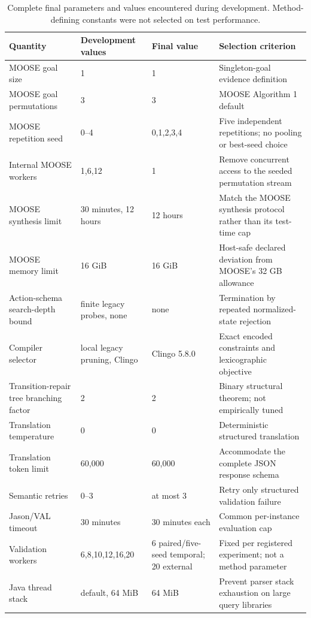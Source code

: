 \begin{table}[htbp]
\centering
\small
\setlength{\tabcolsep}{3pt}
\begin{tabular}{p{}p{}p{}p{}}
\toprule
Quantity & Development values & Final value & Selection criterion \\
\midrule
MOOSE goal size & 1 & 1 & Singleton-goal evidence definition \\
MOOSE goal permutations & 3 & 3 & MOOSE Algorithm 1 default \\
MOOSE repetition seed & 0--4 & 0,1,2,3,4 &
Five independent repetitions; no pooling or best-seed choice \\
Internal MOOSE workers & 1,6,12 & 1 & Remove concurrent access to the seeded permutation stream \\
MOOSE synthesis limit & 30 minutes, 12 hours & 12 hours &
Match the MOOSE synthesis protocol rather than its test-time cap \\
MOOSE memory limit & 16 GiB & 16 GiB & Host-safe declared deviation from MOOSE's 32 GB allowance \\
Action-schema search-depth bound & finite legacy probes, none & none &
Termination by repeated normalized-state rejection \\
Compiler selector & local legacy pruning, Clingo & Clingo 5.8.0 &
Exact encoded constraints and lexicographic objective \\
Transition-repair tree branching factor & 2 & 2 & Binary structural theorem;
not empirically tuned \\
Translation temperature & 0 & 0 & Deterministic structured translation \\
Translation token limit & 60,000 & 60,000 & Accommodate the complete JSON response schema \\
Semantic retries & 0--3 & at most 3 & Retry only structured validation failure \\
Jason/VAL timeout & 30 minutes & 30 minutes each & Common per-instance evaluation cap \\
Validation workers & 6,8,10,12,16,20 & 6 paired/five-seed temporal; 20 external &
Fixed per registered experiment; not a method parameter \\
Java thread stack & default, 64 MiB & 64 MiB &
Prevent parser stack exhaustion on large query libraries \\
\bottomrule
\end{tabular}
\caption{Complete final parameters and values encountered during development.
Method-defining constants were not selected on test performance.}
\label{tab:parameters}
\end{table}

